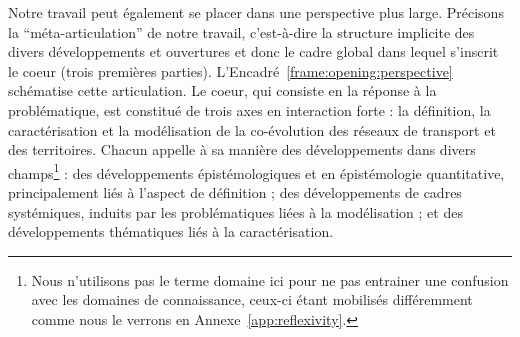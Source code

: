 Notre travail peut également se placer dans une perspective plus large. Précisons la ``méta-articulation'' de notre travail, c'est-à-dire la structure implicite des divers développements et ouvertures et donc le cadre global dans lequel s'inscrit le coeur (trois premières parties). L'Encadré~\ref{frame:opening:perspective} schématise cette articulation. Le coeur, qui consiste en la réponse à la problématique, est constitué de trois axes en interaction forte : la définition, la caractérisation et la modélisation de la co-évolution des réseaux de transport et des territoires. Chacun appelle à sa manière des développements dans divers champs\footnote{Nous n'utilisons pas le terme domaine ici pour ne pas entrainer une confusion avec les domaines de connaissance, ceux-ci étant mobilisés différemment comme nous le verrons en Annexe~\ref{app:reflexivity}.} : des développements épistémologiques et en épistémologie quantitative, principalement liés à l'aspect de définition ; des développements de cadres systémiques, induits par les problématiques liées à la modélisation ; et des développements thématiques liés à la caractérisation.


